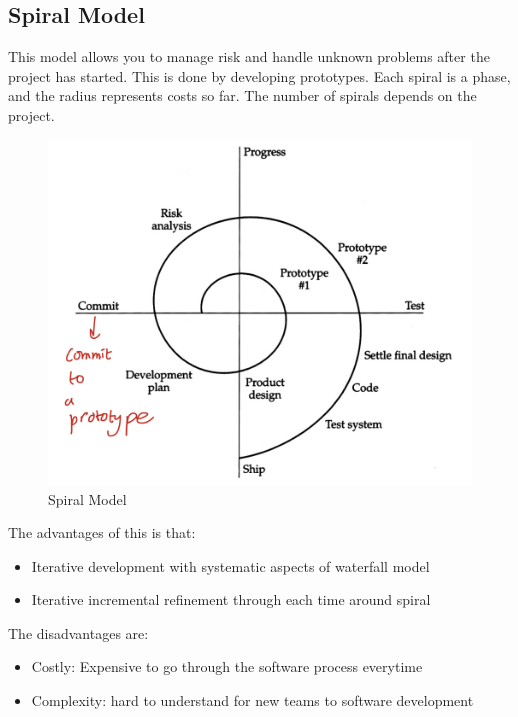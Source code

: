 \documentclass{article}
\begin{document}
\subsection{Spiral Model}
This model allows you to manage risk and handle unknown problems after the project has started. This is done by developing prototypes. Each spiral is a phase, and the radius represents costs so far. The number of spirals depends on the project.
\begin{figure}[H]
    \centering
\includegraphics[width=0.6\linewidth]{Pictures/Screenshot 2023-02-08 at 12.27.15.png}
\caption{Spiral Model}
\end{figure}
The advantages of this is that:
\begin{itemize}
    \item Iterative development with systematic aspects of waterfall model
    \item Iterative incremental refinement through each time around spiral
\end{itemize}
The disadvantages are:
\begin{itemize}
    \item Costly: Expensive to go through the software process everytime
    \item Complexity: hard to understand for new teams to software development
\end{itemize}
\end{document}

